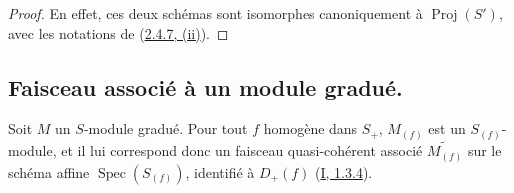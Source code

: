 \begin{proof}
En effet, ces deux schémas sont isomorphes canoniquement à
$\operatorname{Proj}(S')$, avec les notations de
(\hyperref[II.2.4.7-fr]{2.4.7, (ii)}).
\end{proof}

\subsection{Faisceau associé à un module gradué.}
\label{subsection:II.2.5-fr}

\begin{env}[2.5.1]
\label{II.2.5.1-fr}
Soit $M$ un $S$-module gradué. Pour tout $f$ homogène dans $S_+$,
$M_{(f)}$ est un $S_{(f)}$-module, et il lui correspond donc un faisceau
quasi-cohérent associé $\widetilde{M_{(f)}}$ sur le schéma affine
$\operatorname{Spec}(S_{(f)})$, identifié à $D_+(f)$
(\hyperref[I.1.3.4-fr]{I, 1.3.4}).
\end{env}
